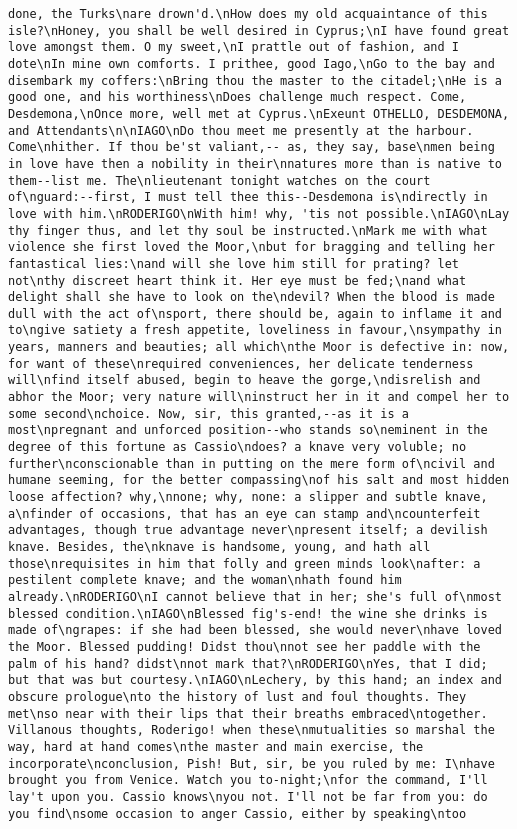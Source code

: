 \begin{verbatim}
done, the Turks\nare drown'd.\nHow does my old acquaintance of this isle?\nHoney, you shall be well desired in Cyprus;\nI have found great love amongst them. O my sweet,\nI prattle out of fashion, and I dote\nIn mine own comforts. I prithee, good Iago,\nGo to the bay and disembark my coffers:\nBring thou the master to the citadel;\nHe is a good one, and his worthiness\nDoes challenge much respect. Come, Desdemona,\nOnce more, well met at Cyprus.\nExeunt OTHELLO, DESDEMONA, and Attendants\n\nIAGO\nDo thou meet me presently at the harbour. Come\nhither. If thou be'st valiant,-- as, they say, base\nmen being in love have then a nobility in their\nnatures more than is native to them--list me. The\nlieutenant tonight watches on the court of\nguard:--first, I must tell thee this--Desdemona is\ndirectly in love with him.\nRODERIGO\nWith him! why, 'tis not possible.\nIAGO\nLay thy finger thus, and let thy soul be instructed.\nMark me with what violence she first loved the Moor,\nbut for bragging and telling her fantastical lies:\nand will she love him still for prating? let not\nthy discreet heart think it. Her eye must be fed;\nand what delight shall she have to look on the\ndevil? When the blood is made dull with the act of\nsport, there should be, again to inflame it and to\ngive satiety a fresh appetite, loveliness in favour,\nsympathy in years, manners and beauties; all which\nthe Moor is defective in: now, for want of these\nrequired conveniences, her delicate tenderness will\nfind itself abused, begin to heave the gorge,\ndisrelish and abhor the Moor; very nature will\ninstruct her in it and compel her to some second\nchoice. Now, sir, this granted,--as it is a most\npregnant and unforced position--who stands so\neminent in the degree of this fortune as Cassio\ndoes? a knave very voluble; no further\nconscionable than in putting on the mere form of\ncivil and humane seeming, for the better compassing\nof his salt and most hidden loose affection? why,\nnone; why, none: a slipper and subtle knave, a\nfinder of occasions, that has an eye can stamp and\ncounterfeit advantages, though true advantage never\npresent itself; a devilish knave. Besides, the\nknave is handsome, young, and hath all those\nrequisites in him that folly and green minds look\nafter: a pestilent complete knave; and the woman\nhath found him already.\nRODERIGO\nI cannot believe that in her; she's full of\nmost blessed condition.\nIAGO\nBlessed fig's-end! the wine she drinks is made of\ngrapes: if she had been blessed, she would never\nhave loved the Moor. Blessed pudding! Didst thou\nnot see her paddle with the palm of his hand? didst\nnot mark that?\nRODERIGO\nYes, that I did; but that was but courtesy.\nIAGO\nLechery, by this hand; an index and obscure prologue\nto the history of lust and foul thoughts. They met\nso near with their lips that their breaths embraced\ntogether. Villanous thoughts, Roderigo! when these\nmutualities so marshal the way, hard at hand comes\nthe master and main exercise, the incorporate\nconclusion, Pish! But, sir, be you ruled by me: I\nhave brought you from Venice. Watch you to-night;\nfor the command, I'll lay't upon you. Cassio knows\nyou not. I'll not be far from you: do you find\nsome occasion to anger Cassio, either by speaking\ntoo 
\end{verbatim}
